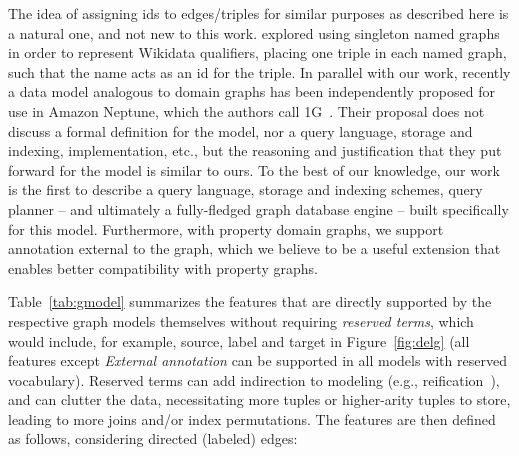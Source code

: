 The idea of assigning ids to edges/triples for similar purposes as described here is a natural one, and not new to this work. \citet{HernandezHK15} explored using singleton named graphs in order to represent Wikidata qualifiers, placing one triple in each named graph, such that the name acts as an id for the triple. In parallel with our work, recently a data model analogous to domain graphs has been independently proposed for use in Amazon Neptune, which the authors call 1G~\cite{LassilaSBBBKKLST}. Their proposal does not discuss a formal definition for the model, nor a query language, storage and indexing, implementation, etc., but the reasoning and justification that they put forward for the model is similar to ours. To the best of our knowledge, our work is the first to describe a query language, storage and indexing schemes, query planner -- and ultimately a fully-fledged graph database engine -- built specifically for this model. Furthermore, with property domain graphs, we support annotation external to the graph, which we believe to be a useful extension that enables better compatibility with property graphs.

Table~\ref{tab:gmodel} summarizes the features that are directly supported by the respective graph models themselves without requiring \textit{reserved terms}, which would include, for example, \textsf{source}, \textsf{label} and \textsf{target} in Figure~\ref{fig:delg} (all features except \textit{External annotation} can be supported in all models with reserved vocabulary). Reserved terms can add indirection to modeling (e.g., reification~\cite{HernandezHK15}), and can clutter the data, necessitating more tuples or higher-arity tuples to store, leading to more joins and/or index permutations. The features are then defined as follows, considering directed (labeled) edges:

